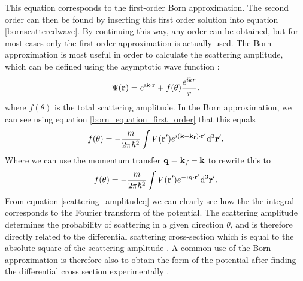 This equation corresponds to the first-order Born approximation. The second order can then be found by inserting this first order solution into equation \ref{bornscatteredwave}. By continuing this way, any order can be obtained, but for most cases only the first order approximation is actually used. The Born approximation is most useful in order to calculate the scattering amplitude, which can be defined using the asymptotic wave function \cite{Griffiths_QM}:
\begin{equation}
	\Psi(\vb{r}) = e^{i\vb{k}\cdot \vb{r}} + f(\theta) \frac{e^{ikr}}{r}.
\end{equation}
where $f(\theta)$ is  the total scattering amplitude. In the Born approximation, we can see using equation \ref{born_equation_first_order} that this equals
\begin{equation}\label{scattering_amplitude}
	 f(\theta) = -  \frac{m}{2 \pi \hbar^2} \int V(\vb{r}')e^{i(\vb{k}- \vb{k_f})\cdot\vb{r}'}\dd^3 \vb{r}'.
\end{equation}
Where we can use the momentum transfer $\vb{q} = \vb{k}_f - \vb{k}$  to rewrite this to
\begin{equation}\label{scattering_amplitudeq}
f(\theta)  = -  \frac{m}{2 \pi \hbar^2} \int  V(\vb{r}') e^{-i\vb{q} \cdot \vb{r}'} \dd^3 \vb{r}'.
\end{equation}
From equation \ref{scattering_amplitudeq} we can clearly see how the the integral corresponds to the Fourier transform of the potential. The scattering amplitude determines the probability of scattering in a given direction $\theta$, and is therefore directly related to the differential scattering cross-section which is equal to the absolute square of the scattering amplitude \cite{Griffiths_QM}. A common use of the Born approximation is therefore also to obtain the form of the potential after finding the differential cross section experimentally \cite{born_detailed}.
